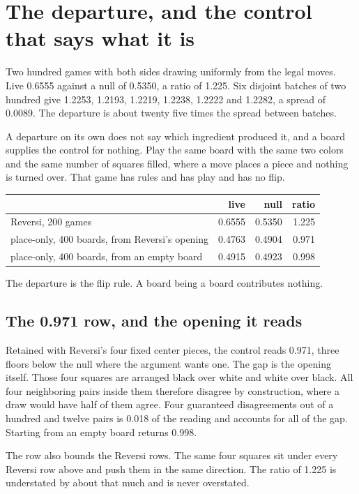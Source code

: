 \section{The departure, and the control that says what it is}

Two hundred games with both sides drawing uniformly from the legal moves. Live 0.6555 against a null
of 0.5350, a ratio of 1.225. Six disjoint batches of two hundred give 1.2253, 1.2193, 1.2219, 1.2238,
1.2222 and 1.2282, a spread of 0.0089. The departure is about twenty five times the spread between
batches.

A departure on its own does not say which ingredient produced it, and a board supplies the control
for nothing. Play the same board with the same two colors and the same number of squares filled,
where a move places a piece and nothing is turned over. That game has rules and has play and has no
flip.

\begin{center}
\begin{tabular}{@{}lrrr@{}}
\toprule
& live & null & ratio \\
\midrule
Reversi, 200 games & 0.6555 & 0.5350 & 1.225 \\
place-only, 400 boards, from Reversi's opening & 0.4763 & 0.4904 & 0.971 \\
place-only, 400 boards, from an empty board & 0.4915 & 0.4923 & 0.998 \\
\bottomrule
\end{tabular}
\end{center}

The departure is the flip rule. A board being a board contributes nothing.

\subsection{The 0.971 row, and the opening it reads}

Retained with Reversi's four fixed center pieces, the control reads 0.971, three floors below the null
where the argument wants one. The gap is the opening itself. Those four
squares are arranged black over white and white over black. All four neighboring pairs inside them
therefore disagree by construction, where a draw would have half of them agree. Four guaranteed
disagreements out of a hundred and twelve pairs is 0.018 of the reading and accounts for all of the
gap. Starting from an empty board returns 0.998.

The row also bounds the Reversi rows. The same four squares sit under every Reversi row
above and push them in the same direction. The ratio of 1.225 is understated by about that much and
is never overstated.

